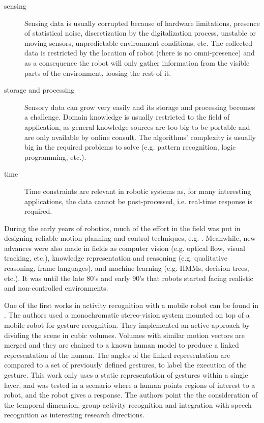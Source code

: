 \begin{description}
\item[sensing] Sensing data is usually corrupted because of hardware limitations, presence of statistical noise, discretization by the digitalization process, unstable or moving sensors, unpredictable environment conditions, etc.
The collected data is restricted by the location of robot (there is no omni-presence) and as a consequence the robot will only gather information from the visible parts of the environment, loosing the rest of it.
\item[storage and processing] %
Sensory data can grow very easily and its storage and processing becomes a challenge.
Domain knowledge is usually restricted to the field of application, as general knowledge sources are too big to be portable and are only available by online consult.
The algorithms' complexity is usually big in the required problems to solve (e.g. pattern recognition, logic programming, etc.). 
\item[time] Time constraints are relevant in robotic systems as, for many interesting applications, the data cannot be post-processed, i.e. real-time response is required.
\end{description}

During the early years of robotics, much of the effort in the field was put in designing reliable motion planning and control techniques, e.g. \citep{Moravec1983_StanfordCMUCarts,brook-1985:robuslayer:TR}. 
Meanwhile, new advances were also made in fields as computer vision (e.g. optical flow, visual tracking, etc.), knowledge representation and reasoning (e.g. qualitative reasoning, frame languages), and machine learning (e.g. HMMs, decision trees, etc.).
It was until the late 80's and early 90's that robots started facing realistic and non-controlled environments.

One of the first works in activity recognition with a mobile robot can be found in \citep{Kortenkamp1996_RIG,Bonasso96recognizingand}. 
The authors used a monochromatic stereo-vision system mounted on top of a mobile robot for gesture recognition.
They implemented an active approach by dividing the scene in cubic volumes.
Volumes with similar motion vectors are merged and they are chained to a known human model to produce a linked representation of the human.
The angles of the linked representation are compared to a set of previously defined gestures, to label the execution of the gesture.
This work only uses a static representation of gestures within a single layer, and was tested in a scenario where a human points regions of interest to a robot, and the robot gives a response.
The authors point the the consideration of the temporal dimension, group activity recognition and integration with speech recognition as interesting research directions.

